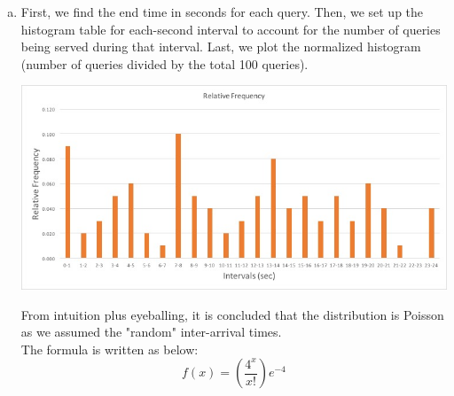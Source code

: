 \documentclass{article}   	                         %
\begin{document}
\begin{enumerate}[(a)]
\item
First, we find the end time in seconds for each query.  Then, we set up the histogram table for each-second interval to account for the number of queries being served during that interval. Last, we plot the normalized histogram (number of queries divided by the total 100 queries).\\
\begin{center}
\includegraphics[scale = 0.5]{Picture3.jpg}
\end{center}
From intuition plus eyeballing, it is concluded that the distribution is Poisson as we assumed the "random" inter-arrival times.\\
The formula is written as below:\\
\begin{equation}
f(x) = \left(\frac{4^x}{x!}\right)e^{-4}
\end{equation}
\end{enumerate}
\end{document}
